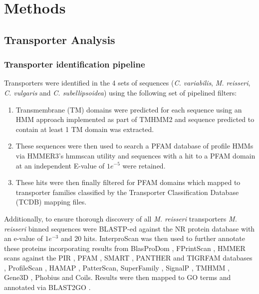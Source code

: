 {{\section{Methods}
\subsection{Transporter Analysis} 
\subsubsection{Transporter identification pipeline}
Transporters were identified in the 4 sets of sequences (\textit{C. variabilis}, \textit{M. reisseri},
\textit{C. vulgaris} and \textit{C. subellipsoidea}) using the following set of pipelined filters:
\begin{enumerate}
    \item Transmembrane (TM) domains were predicted for each sequence using an HMM approach implemented as part of TMHMM2 \citep{Sonnhammer1998,Krogh2001}
and sequence predicted to contain at least 1 TM domain was extracted.
    \item These sequences were then used to search a PFAM database of profile HMMs \citep{Eddy1998} via HMMER3's hmmscan utility \citep{Eddy1995,Johnson2010,Eddy2011,Mistry2013}
        and sequences with a hit to a PFAM domain at an independent E-value of \(1e^{-5}\) were retained.
    \item These hits were then finally filtered for PFAM domains which mapped to transporter families classified by the Transporter Classification Database (TCDB) \citep{Saier2006,Saier2008,Saier2009,Saier2014}
        mapping files.
\end{enumerate}

Additionally, to ensure thorough discovery of 
all \textit{M. reisseri} transporters \textit{M. reisseri} binned sequences 
were BLASTP-ed against the NR protein database with an e-value of \(1e^{-3}\) and 20 hits.
InterproScan \citep{Zdobnov2001a} was then used to 
further annotate these proteins incorporating
results from BlasProDom \citep{Servant2002}, FPrintScan \citep{Attwood1994}, 
HMMER \citep{Eddy2001} scans against the PIR \citep{Barker1998}, PFAM \citep{Bateman2002}, 
SMART \citep{Schultz1998}, PANTHER \citep{Thomas2003a} and TIGRFAM databases \citep{Haft2003}, 
ProfileScan \citep{Gribskov1988},
HAMAP \citep{Lima2009}, PatterScan, 
SuperFamily \citep{Gough2002}, 
SignalP \citep{Petersen2011}, TMHMM \citep{Sonnhammer1998}, 
Gene3D \citep{Buchan2002}, Phobius \citep{Kall2007}
and Coils. Results were then mapped to GO terms \citep{Ashburner2000,Harris2004}
and annotated via BLAST2GO \citep{Conesa2005a}.

}}
